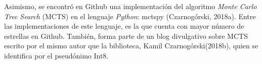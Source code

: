 Asimismo, se encontró en Github una implementación del algoritmo \textit{Monte
Carlo Tree Search} (MCTS) en el lenguaje \textit{Python}: mctspy
(Czarnogórski, 2018a). Entre las implementaciones de este lenguaje, es la que
cuenta con mayor número de estrellas en Github. También, forma parte de un blog
divulgativo sobre MCTS escrito por el mismo autor que la biblioteca, Kamil
Czarnogórski(2018b), quien se identifica por el pseudónimo Int8.





